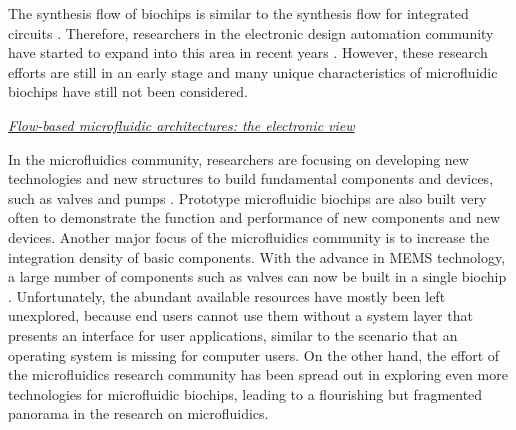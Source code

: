     The synthesis flow of biochips
    is similar
    to the synthesis flow for integrated circuits \cite{Micheli94}. Therefore,
    researchers in the electronic design automation community have started to expand
    into this area in recent years \cite{ChakrabartyFZ10,PopAC15}. 
    However, these research efforts 
    are still in an early stage and many unique characteristics of microfluidic
    biochips have still not been considered. %
    
    \vskip 8pt
    \textit{\underline{Flow-based microfluidic architectures: the electronic view}}
    
    In the microfluidics community, researchers are focusing on developing new
    technologies and new structures to build fundamental components and devices,
    such as valves and pumps
    \cite{Unger113,mathies2010multiplexed}.
    Prototype microfluidic biochips are also built very often %
    to demonstrate the function and performance of new
    components and new devices.
    Another major focus of the microfluidics community is to
    increase the integration density of basic components. With the advance in MEMS
    technology, a large number of components such as valves can now be built in a
    single biochip \cite{C2LC40258K}. 
    Unfortunately, the abundant available resources 
    have mostly been left unexplored, because end users cannot use them 
    without a system layer that presents an interface for user applications,
    similar to the scenario that an operating system is missing 
    for computer users. On the other hand, 
    the effort of the microfluidics research community
    has been spread out in exploring even 
    more technologies for microfluidic biochips, 
    leading to a flourishing but fragmented panorama in the research on
    microfluidics. 
    
